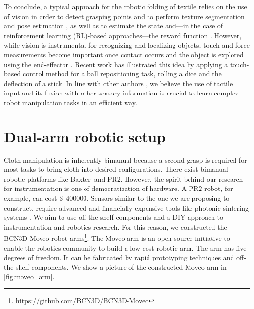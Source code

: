 \documentclass[\home/main.tex]{subfiles}
\begin{document}
To conclude, a typical approach for the robotic folding of textile relies on the use of vision in order to detect grasping points and to perform texture segmentation and pose estimation \autocite{Maitin2010, Doumanoglou2016, Bersch2011}, as well as to estimate the state \autocite{Matas2018} and---in the case of reinforcement learning (RL)-based approaches---the reward function \autocite{Tsurumine2019}. However, while vision is instrumental for recognizing and localizing objects, touch and force measurements become important once contact occurs and the object is explored using the end-effector \autocite{Billard2019}. Recent work \autocite{Tian2019} has illustrated this idea by applying a touch-based control method for a ball repositioning task, rolling a dice and the deflection of a stick. In line with other authors \autocite{Tian2019, Lee2019}, we believe the use of tactile input and its fusion with other sensory information is crucial to learn complex robot manipulation tasks in an efficient way.


\section{Dual-arm robotic setup} \label{sec:instrumentation_robotic_setup}


Cloth manipulation is inherently bimanual because a second grasp is required for most tasks to bring cloth into desired configurations. There exist bimanual robotic platforms like Baxter\textregistered\ and PR2\textregistered. However, the spirit behind our research for instrumentation is one of democratization of hardware. A PR2 robot, for example, can cost \SI{400000}[\$]{}. Sensors similar to the one we are proposing to construct, require advanced and financially expensive tools like photonic sintering systems \autocite{You2016sensor}.
We aim to use off-the-shelf components and a DIY approach to instrumentation and robotics research. For this reason, we constructed the BCN3D Moveo robot arms\footnote{\url{https://github.com/BCN3D/BCN3D-Moveo}}. The Moveo arm is an open-source initiative to enable the robotics community to build a low-cost robotic arm. The arm has five degrees of freedom. It can be fabricated by rapid prototyping techniques and off-the-shelf components. We show a picture of the constructed Moveo arm in \cref{fig:moveo_arm}.
\end{document}
